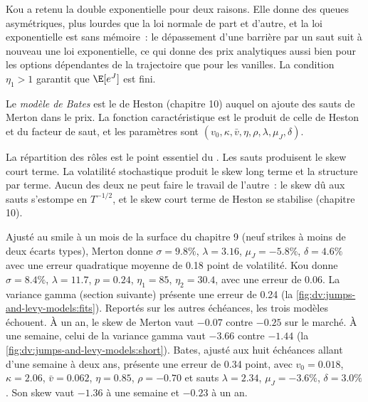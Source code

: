 Kou a retenu la double exponentielle pour deux raisons. Elle donne des queues asymétriques, plus lourdes que la loi normale de part et d'autre,
et la loi exponentielle est sans mémoire~: le dépassement d'une barrière par un saut suit à nouveau une loi exponentielle,
ce qui donne des prix analytiques aussi bien pour les options dépendantes de la trajectoire que pour les vanilles. La condition $\eta_1>1$ garantit que $\E[e^J]$ est fini.

\begin{definition}\label{def:dv:jumps-and-levy-models:bates}
Le \emph{modèle de Bates} est le  de Heston (chapitre 10) auquel on ajoute des sauts de Merton
dans le prix. La fonction caractéristique est le produit de celle de Heston et du facteur de saut, et les
paramètres sont $(v_0,\kappa,\bar v,\eta,\rho,\lambda,\mu_J,\delta)$.
\end{definition}

La répartition des rôles est le point essentiel du . Les sauts produisent le skew court terme. La volatilité
stochastique produit le skew long terme et la structure par terme. Aucun des deux ne peut faire le travail de l'autre~: le skew dû aux sauts s'estompe
en $T^{-1/2}$, et le skew court terme de Heston se stabilise (chapitre 10).

\begin{example}\label{ex:dv:jumps-and-levy-models:fits}
Ajusté au smile à un mois de la surface du chapitre 9 (neuf strikes à moins de deux écarts types), Merton donne
$\sigma=9.8\%$, $\lambda=3.16$, $\mu_J=-5.8\%$, $\delta=4.6\%$ avec une erreur quadratique moyenne de 0.18 point
de volatilité. Kou donne $\sigma=8.4\%$, $\lambda=11.7$, $p=0.24$, $\eta_1=85$, $\eta_2=30.4$, avec une erreur de 0.06.
La variance gamma (section suivante) présente une erreur de 0.24 (la \cref{fig:dv:jumps-and-levy-models:fits}). Reportés sur
les autres échéances, les trois modèles échouent. À un an, le skew de Merton vaut $-0.07$ contre $-0.25$ sur le marché. À une semaine, celui de la variance
gamma vaut $-3.66$ contre $-1.44$ (la \cref{fig:dv:jumps-and-levy-models:short}). Bates, ajusté aux huit échéances
allant d'une semaine à deux ans, présente une erreur de 0.34 point, avec $v_0=0.018$, $\kappa=2.06$, $\bar v=0.062$,
$\eta=0.85$, $\rho=-0.70$ et sauts $\lambda=2.34$, $\mu_J=-3.6\%$, $\delta=3.0\%$. Son skew vaut $-1.36$ à une semaine
et $-0.23$ à un an.
\end{example}

